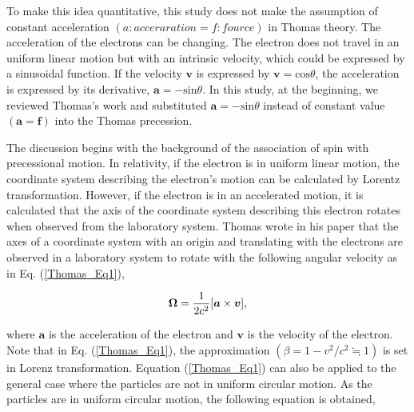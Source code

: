 \documentclass[%
 reprint,
 amsmath,amssymb,
 aps,
]{revtex4-1}
\numberwithin{equation}{section}%
\begin{document}
To make this idea quantitative, this study does not make the assumption of constant acceleration $(a: acceraration = f: fource)$ in Thomas theory. The acceleration of the electrons can be changing. The electron does not travel in an uniform linear motion but with an intrinsic velocity, which could be expressed by a sinusoidal function. If the velocity ${\boldsymbol v}$ is expressed by ${\boldsymbol v} = \mathrm{cos}\theta$, the acceleration is expressed by its derivative, ${\boldsymbol a} = - \mathrm{sin}\theta$. In this study, at the beginning, we reviewed Thomas's work and substituted ${\boldsymbol a} = -\mathrm{sin}\theta$ instead of constant value $({\boldsymbol a} = {\boldsymbol f})$ into the Thomas precession. 



The discussion begins with the background of the association of spin with precessional motion. In relativity, if the electron is in uniform linear motion, the coordinate system describing the electron's motion can be calculated by Lorentz transformation. However, if the electron is in an accelerated motion, it is calculated that the axis of the coordinate system describing this electron rotates when observed from the laboratory system. Thomas wrote in his paper that the axes of a coordinate system with an origin and translating with the electrons are observed in a laboratory system to rotate with the following angular velocity as in Eq. (\ref{Thomas_Eq1}),

\begin{equation}
    {\bf \Omega}=\frac{1}{2 c^2}[{\boldsymbol a} \times {\boldsymbol v}],
    \label{Thomas_Eq1}
\end{equation}

\noindent where ${\boldsymbol a}$ is the acceleration of the electron and ${\boldsymbol v}$ is the velocity of the electron. Note that in Eq. (\ref{Thomas_Eq1}), the approximation $(\beta = 1 - v^2/c^2 \fallingdotseq 1)$ is set in Lorenz transformation. Equation (\ref{Thomas_Eq1}) can also be applied to the general case where the particles are not in uniform circular motion. As the particles are in uniform circular motion, the following equation is obtained,
\end{document}
